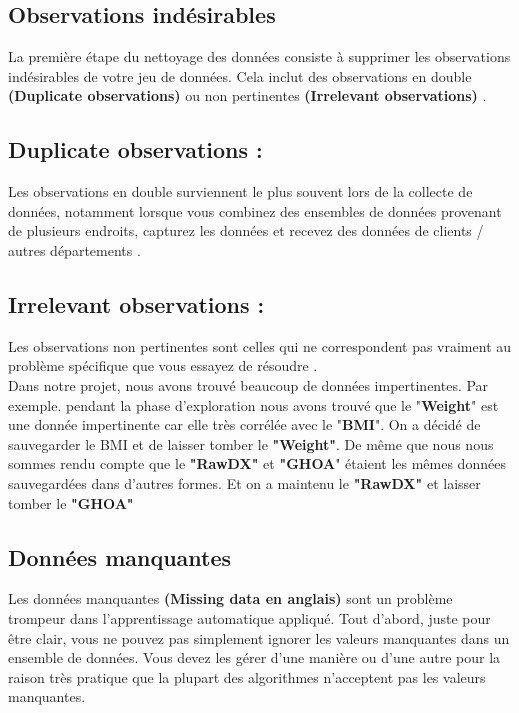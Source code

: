 \documentclass[12pt, french]{report}
\begin{document}
\subsection{Observations indésirables} La première étape du nettoyage des données consiste à supprimer les observations indésirables de votre jeu de données. Cela inclut des observations en double \textbf{(Duplicate observations)} ou non pertinentes \textbf{(Irrelevant observations)} \cite{key21}.

\subsection{Duplicate observations :} Les observations en double surviennent le plus souvent lors de la collecte de données, notamment lorsque vous combinez des ensembles de données provenant de plusieurs endroits, capturez les données et recevez des données de clients / autres départements \cite{key21}.

\subsection{Irrelevant observations :} Les observations non pertinentes sont celles qui ne correspondent pas vraiment au problème spécifique que vous essayez de résoudre \cite{key21}. \\

Dans notre projet, nous avons trouvé beaucoup de données impertinentes. Par exemple. pendant la phase d'exploration nous avons trouvé que le "\textbf{Weight}" est une donnée impertinente car elle très corrélée avec le "\textbf{BMI}". On a décidé de sauvegarder le BMI et de laisser tomber le \textbf{"Weight"}.  De même que nous nous sommes rendu compte que le \textbf{"RawDX"} et \textbf{"GHOA}" étaient les mêmes données sauvegardées dans d'autres formes. Et on a maintenu le \textbf{"RawDX"} et laisser tomber le \textbf{"GHOA"}

\subsection{Données manquantes}
Les données manquantes \textbf{(Missing data en anglais)} sont un problème trompeur dans l'apprentissage automatique appliqué. Tout d'abord, juste pour être clair, vous ne pouvez pas simplement ignorer les valeurs manquantes dans un ensemble de données. Vous devez les gérer d'une manière ou d'une autre pour la raison très pratique que la plupart des algorithmes n'acceptent pas les valeurs manquantes.\\
\end{document}
